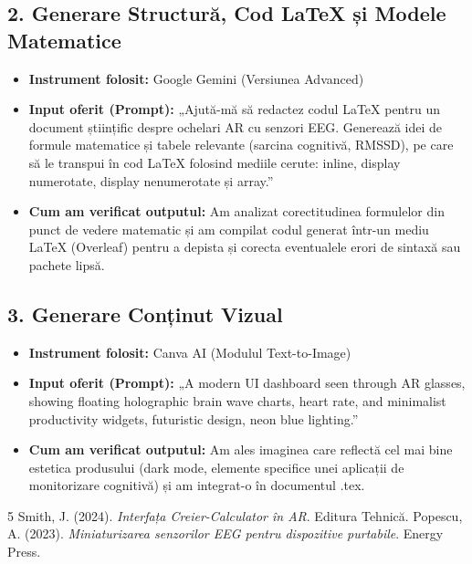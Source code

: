 \documentclass[12pt, a4paper]{article}
\begin{document}
\subsection{2. Generare Structură, Cod LaTeX și Modele Matematice}
\begin{itemize}
    \item \textbf{Instrument folosit:} Google Gemini (Versiunea Advanced)
    \item \textbf{Input oferit (Prompt):} „Ajută-mă să redactez codul LaTeX pentru un document științific despre ochelari AR cu senzori EEG. Generează idei de formule matematice și tabele relevante (sarcina cognitivă, RMSSD), pe care să le transpui în cod LaTeX folosind mediile cerute: inline, display numerotate, display nenumerotate și array.”
    \item \textbf{Cum am verificat outputul:} Am analizat corectitudinea formulelor din punct de vedere matematic și am compilat codul generat într-un mediu LaTeX (Overleaf) pentru a depista și corecta eventualele erori de sintaxă sau pachete lipsă.
\end{itemize}

\subsection{3. Generare Conținut Vizual}
\begin{itemize}
    \item \textbf{Instrument folosit:} Canva AI (Modulul Text-to-Image)
    \item \textbf{Input oferit (Prompt):} „A modern UI dashboard seen through AR glasses, showing floating holographic brain wave charts, heart rate, and minimalist productivity widgets, futuristic design, neon blue lighting.”
    \item \textbf{Cum am verificat outputul:} Am ales imaginea care reflectă cel mai bine estetica produsului (dark mode, elemente specifice unei aplicații de monitorizare cognitivă) și am integrat-o în documentul .tex.
\end{itemize}

\begin{thebibliography}{5}
 Smith, J. (2024). \textit{Interfața Creier-Calculator în AR}. Editura Tehnică.
 Popescu, A. (2023). \textit{Miniaturizarea senzorilor EEG pentru dispozitive purtabile}. Energy Press.
\end{thebibliography}
\end{document}
